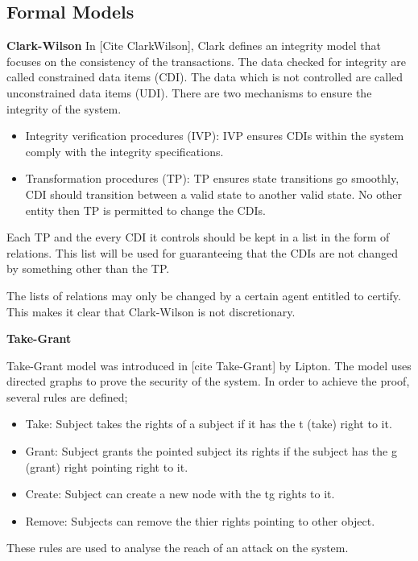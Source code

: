 \documentclass[11pt]{article} %
\begin{document}
\subsection{Formal Models}

\textbf{Clark-Wilson} In [Cite ClarkWilson], Clark defines an integrity model that focuses on the consistency of the transactions.
The data checked for integrity are called constrained data items (CDI).
The data which is not controlled are called unconstrained data items (UDI).
There are two mechanisms to ensure the integrity of the system.

\begin{itemize}
\item Integrity verification procedures (IVP): IVP ensures CDIs within the system comply with the integrity specifications.
\item Transformation procedures (TP): TP ensures state transitions go smoothly, CDI should transition between a valid state to another valid state. No other entity then TP is permitted to change the CDIs.
\end{itemize}

Each TP and the every CDI it controls should be kept in a list in the form of relations.
This list will be used for guaranteeing that the CDIs are not changed by something other than the TP.

The lists of relations may only be changed by a certain agent entitled to certify.
This makes it clear that Clark-Wilson is not discretionary.

\textbf{Take-Grant}

Take-Grant model was introduced in [cite Take-Grant] by Lipton.
The model uses directed graphs to prove the security of the system. In order to achieve the proof, several rules are defined;

\begin{itemize}
\item Take: Subject takes the rights of a subject if it has the t (take) right to it.
\item Grant: Subject grants the pointed subject its rights if the subject has the g (grant) right pointing right to it.
\item Create: Subject can create a new node with the tg rights to it.
\item Remove: Subjects can remove the thier rights pointing to other object.
\end{itemize}

These rules are used to analyse the reach of an attack on the system.
\end{document}
